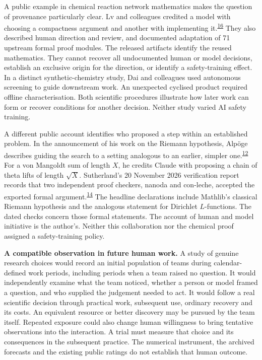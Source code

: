 \documentclass[11pt,a4paper]{article}
\newcommand{\lead}[1]{\textbf{#1}\enspace}
\newcommand{\articlecite}[2]{\textsuperscript{\href{#2}{#1}}}
\begin{document}
A public example in chemical reaction network mathematics makes the question of provenance particularly clear. Lv and colleagues credited a model with choosing a compactness argument and another with implementing it.\articlecite{16}{https://arxiv.org/abs/2610.30808v1} They also described human direction and review, and documented adaptation of 71 upstream formal proof modules. The released artifacts identify the reused mathematics. They cannot recover all undocumented human or model decisions, establish an exclusive origin for the direction, or identify a safety-training effect. In a distinct synthetic-chemistry study, Dai and colleagues used autonomous screening to guide downstream work.\cite{dai} An unexpected cyclised product required offline characterisation. Both scientific procedures illustrate how later work can form or recover conditions for another decision. Neither study varied AI safety training.

A different public account identifies who proposed a step within an established problem. In the announcement of his work on the Riemann hypothesis, Alpöge describes guiding the search to a setting analogous to an earlier, simpler one.\articlecite{12}{https://alpo.ge/remark.pdf} For a von Mangoldt sum of length \(X\), he credits Claude with proposing a chain of theta lifts of length \(\sqrt{X}\). Sutherland's 20 November 2026 verification report records that two independent proof checkers, nanoda and con-leche, accepted the exported formal argument.\articlecite{14}{https://math.mit.edu/~drew/grh/} The headline declarations include Mathlib's classical Riemann hypothesis and the analogous statement for Dirichlet \(L\)-functions. The dated checks concern those formal statements. The account of human and model initiative is the author's. Neither this collaboration nor the chemical proof assigned a safety-training policy.


\lead{A compatible observation in future human work.} A study of genuine research choices would record an initial population of teams during calendar-defined work periods, including periods when a team raised no question. It would independently examine what the team noticed, whether a person or model framed a question, and who supplied the judgement needed to act. It would follow a real scientific decision through practical work, subsequent use, ordinary recovery and its costs. An equivalent resource or better discovery may be pursued by the team itself. Repeated exposure could also change human willingness to bring tentative observations into the interaction. A trial must measure that choice and its consequences in the subsequent practice. The numerical instrument, the archived forecasts and the existing public ratings do not establish that human outcome.
\end{document}
